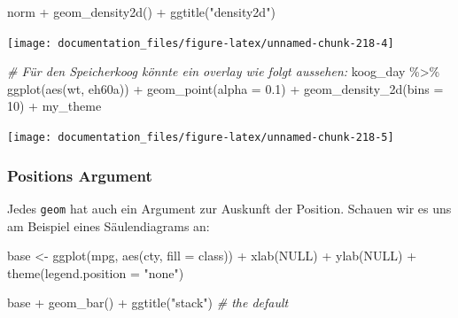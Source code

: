 \documentclass[
]{article}
\newenvironment{Shaded}{\begin{snugshade}}{\end{snugshade}}
\newcommand{\AttributeTok}[1]{\textcolor[rgb]{0.77,0.63,0.00}{#1}}
\newcommand{\CommentTok}[1]{\textcolor[rgb]{0.56,0.35,0.01}{\textit{#1}}}
\newcommand{\ConstantTok}[1]{\textcolor[rgb]{0.00,0.00,0.00}{#1}}
\newcommand{\DecValTok}[1]{\textcolor[rgb]{0.00,0.00,0.81}{#1}}
\newcommand{\FloatTok}[1]{\textcolor[rgb]{0.00,0.00,0.81}{#1}}
\newcommand{\FunctionTok}[1]{\textcolor[rgb]{0.00,0.00,0.00}{#1}}
\newcommand{\NormalTok}[1]{#1}
\newcommand{\OtherTok}[1]{\textcolor[rgb]{0.56,0.35,0.01}{#1}}
\newcommand{\SpecialCharTok}[1]{\textcolor[rgb]{0.00,0.00,0.00}{#1}}
\newcommand{\StringTok}[1]{\textcolor[rgb]{0.31,0.60,0.02}{#1}}
\begin{document}
\begin{Shaded}
\begin{Highlighting}[]
\NormalTok{norm }\SpecialCharTok{+} \FunctionTok{geom\_density2d}\NormalTok{() }\SpecialCharTok{+} \FunctionTok{ggtitle}\NormalTok{(}\StringTok{"density2d"}\NormalTok{)}
\end{Highlighting}
\end{Shaded}

\begin{center}\texttt{[image: documentation\_files/figure-latex/unnamed-chunk-218-4]} \end{center}

\begin{Shaded}
\begin{Highlighting}[]

\CommentTok{\# Für den Speicherkoog könnte ein overlay wie folgt aussehen:}
\NormalTok{koog\_day }\SpecialCharTok{\%\textgreater{}\%}
  \FunctionTok{ggplot}\NormalTok{(}\FunctionTok{aes}\NormalTok{(wt, eh60a)) }\SpecialCharTok{+}
  \FunctionTok{geom\_point}\NormalTok{(}\AttributeTok{alpha =} \FloatTok{0.1}\NormalTok{) }\SpecialCharTok{+}
  \FunctionTok{geom\_density\_2d}\NormalTok{(}\AttributeTok{bins =} \DecValTok{10}\NormalTok{) }\SpecialCharTok{+}
\NormalTok{  my\_theme}
\end{Highlighting}
\end{Shaded}

\begin{center}\texttt{[image: documentation\_files/figure-latex/unnamed-chunk-218-5]} \end{center}

\hypertarget{positions-argument}{%
\subsubsection{Positions Argument}\label{positions-argument}}

Jedes \texttt{geom} hat auch ein Argument zur Auskunft der Position. Schauen wir es uns am Beispiel eines Säulendiagrams an:

\begin{Shaded}
\begin{Highlighting}[]
\NormalTok{base }\OtherTok{\textless{}{-}} \FunctionTok{ggplot}\NormalTok{(mpg, }\FunctionTok{aes}\NormalTok{(cty, }\AttributeTok{fill =}\NormalTok{ class)) }\SpecialCharTok{+} 
  \FunctionTok{xlab}\NormalTok{(}\ConstantTok{NULL}\NormalTok{) }\SpecialCharTok{+} \FunctionTok{ylab}\NormalTok{(}\ConstantTok{NULL}\NormalTok{) }\SpecialCharTok{+} \FunctionTok{theme}\NormalTok{(}\AttributeTok{legend.position =} \StringTok{"none"}\NormalTok{)}

\NormalTok{base }\SpecialCharTok{+} \FunctionTok{geom\_bar}\NormalTok{() }\SpecialCharTok{+} \FunctionTok{ggtitle}\NormalTok{(}\StringTok{"stack"}\NormalTok{) }\CommentTok{\# the default}
\end{Highlighting}
\end{Shaded}
\end{document}
